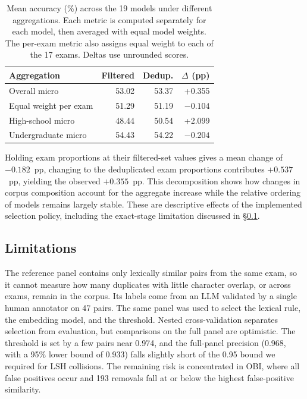 \begin{table}[t]
\centering
\footnotesize
\setlength{\tabcolsep}{3pt}
\begin{tabular}{@{}lrrr@{}}
\toprule
Aggregation & Filtered & Dedup. & $\Delta$ (pp) \\
\midrule
Overall micro & 53.02 & 53.37 & +0.355 \\
Equal weight per exam & 51.29 & 51.19 & $-0.104$ \\
High-school micro & 48.44 & 50.54 & +2.099 \\
Undergraduate micro & 54.43 & 54.22 & $-0.204$ \\
\bottomrule
\end{tabular}
\caption{Mean accuracy (\%) across the 19 models under different
aggregations. Each metric is computed separately for each model, then
averaged with equal model weights. The per-exam metric also assigns equal
weight to each of the 17 exams. Deltas use unrounded scores.}
\label{tab:dedup-short-evaluation-aggregation}
\end{table}

Holding exam proportions at their filtered-set values gives a mean change
of $-0.182$~pp, changing to the deduplicated exam proportions contributes
$+0.537$~pp, yielding the observed $+0.355$~pp. This decomposition shows how
changes in corpus composition account for the aggregate increase while
the relative ordering of models remains largely stable. These are
descriptive effects of the implemented selection policy, including the
exact-stage limitation discussed in \S\ref{app:dedup-short-limitations}.

\subsection{Limitations}
\label{app:dedup-short-limitations}

The reference panel contains only lexically similar pairs from the same exam,
so it cannot measure how many duplicates with little character overlap, or
across exams, remain in the corpus. Its labels come from an LLM validated by a
single human annotator on 47 pairs. The same panel was used to select the
lexical rule, the embedding model, and the threshold. Nested cross-validation
separates selection from evaluation, but comparisons on the full panel are
optimistic. The threshold is set by a few pairs near 0.974, and the full-panel
precision (0.968, with a 95\% lower bound of 0.933) falls slightly short of
the 0.95 bound we required for LSH collisions. The remaining risk is
concentrated in OBI, where all false positives occur and 193 removals fall at
or below the highest false-positive similarity.
